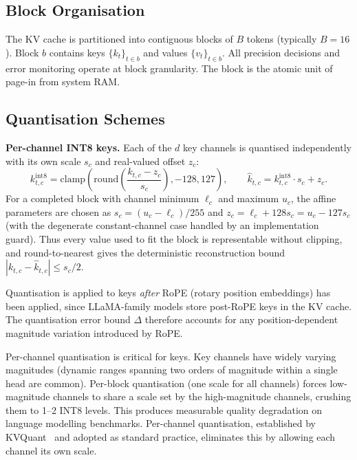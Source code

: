 \documentclass[11pt,a4paper]{article}
\theoremstyle{definition}
\theoremstyle{remark}
\begin{document}
\subsection{Block Organisation}

The KV cache is partitioned into contiguous blocks of $B$ tokens (typically $B = 16$).  Block $b$ contains keys $\{k_t\}_{t \in b}$ and values $\{v_t\}_{t \in b}$.  All precision decisions and error monitoring operate at block granularity.  The block is the atomic unit of page-in from system RAM.

\subsection{Quantisation Schemes}
\label{sec:quant_schemes}

\textbf{Per-channel INT8 keys.}  Each of the $d$ key channels is quantised independently with its own scale $s_c$ and real-valued offset $z_c$:
\begin{equation}
  k_{t,c}^{\mathrm{int8}} = \mathrm{clamp}\!\left(\mathrm{round}\!\left(\frac{k_{t,c} - z_c}{s_c}\right), -128, 127\right), \qquad
  \hat{k}_{t,c} = k_{t,c}^{\mathrm{int8}} \cdot s_c + z_c.
\end{equation}
For a completed block with channel minimum $\ell_c$ and maximum $u_c$, the affine parameters are chosen as $s_c=(u_c-\ell_c)/255$ and $z_c=\ell_c+128s_c=u_c-127s_c$ (with the degenerate constant-channel case handled by an implementation guard).  Thus every value used to fit the block is representable without clipping, and round-to-nearest gives the deterministic reconstruction bound $|k_{t,c}-\hat{k}_{t,c}|\leq s_c/2$.

Quantisation is applied to keys \emph{after} RoPE (rotary position embeddings) has been applied, since LLaMA-family models store post-RoPE keys in the KV cache.  The quantisation error bound $\Delta$ therefore accounts for any position-dependent magnitude variation introduced by RoPE\@.

Per-channel quantisation is critical for keys.  Key channels have widely varying magnitudes (dynamic ranges spanning two orders of magnitude within a single head are common).  Per-block quantisation (one scale for all channels) forces low-magnitude channels to share a scale set by the high-magnitude channels, crushing them to 1--2 INT8 levels.  This produces measurable quality degradation on language modelling benchmarks.  Per-channel quantisation, established by KVQuant~\cite{kvquant} and adopted as standard practice, eliminates this by allowing each channel its own scale.
\end{document}
